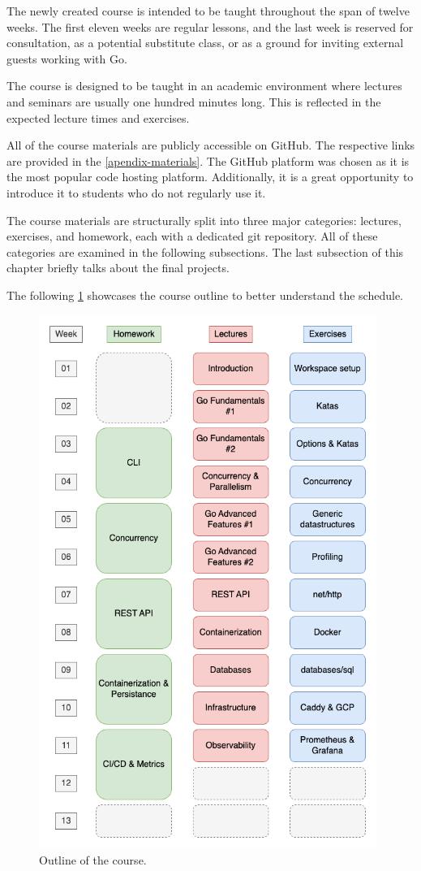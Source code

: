 \documentclass[
  digital,
  color,
  oneside,
  nosansbold,
  nocolorbold,
  nolof,
  nolot,
]{fithesis4}
\begin{document}
The newly created course is intended to be taught throughout the span of twelve weeks. The first eleven weeks are regular lessons, and the last week is reserved for consultation, as a potential substitute class, or as a ground for inviting external guests working with Go.

The course is designed to be taught in an academic environment where lectures and seminars are usually one hundred minutes long. This is reflected in the expected lecture times and exercises.

All of the course materials are publicly accessible on GitHub. The respective links are provided in the \cref{apendix-materials}. The GitHub platform was chosen as it is the most popular code hosting platform\cite{github-wiki}. Additionally, it is a great opportunity to introduce it to students who do not regularly use it.

The course materials are structurally split into three major categories: lectures, exercises, and homework, each with a dedicated git repository. All of these categories are examined in the following subsections. The last subsection of this chapter briefly talks about the final projects.

The following \cref{schedule-outline} showcases the course outline to better understand the schedule.

\begin{figure}[H]
    \centering
    \includegraphics[width=11cm]{figures/schedule.png}
    \caption{Outline of the course.}
    \label{schedule-outline}
\end{figure}
\end{document}

